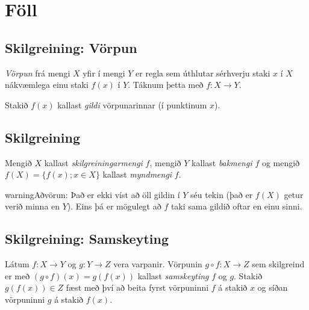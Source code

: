 \documentclass[b5paper,11pt,icelandic]{sphinxmanual}
\begin{document}
\section{Föll}
\label{kafli01:foll}

\subsection{Skilgreining: Vörpun}
\label{kafli01:skilgreining-vorpun}\label{kafli01:index-3}
\textit{Vörpun} frá mengi \(X\) yfir í mengi \(Y\) er
regla sem úthlutar sérhverju staki \(x\) í \(X\) nákvæmlega einu
staki \(f(x)\) í \(Y\). Táknum þetta með \(f:X \to Y\).

Stakið \(f(x)\) kallast \textit{gildi} vörpunarinnar (í punktinum
\(x\)).


\subsection{Skilgreining}
\label{kafli01:skilgreining}\label{kafli01:index-4}
Mengið \(X\) kallast \textit{skilgreiningarmengi}
\(f\), mengið \(Y\) kallast \textit{bakmengi}
\(f\) og mengið
\(f(X) = \{ f(x); x \in X \}\) kallast \textit{myndmengi} \(f\).


\begin{notice}{warning}{Aðvörun:}
Það er ekki víst að öll gildin í \(Y\) séu tekin
(það er \(f(X)\) getur verið minna en \(Y\)). Eins þá er mögulegt
að \(f\) taki sama gildið oftar en einu sinni.
\end{notice}


\subsection{Skilgreining: Samskeyting}
\label{kafli01:skilgreining-samskeyting}\label{kafli01:index-5}\label{kafli01:samskeyting}
Látum \(f:X \to Y\) og \(g:Y \to Z\) vera
varpanir. Vörpunin \(g\circ f:X \to Z\) sem skilgreind er með
\((g\circ f)(x)=g(f(x))\) kallast \textit{samskeyting} \(f\) og
\(g\). Stakið \(g(f(x)) \in Z\) fæst með því að beita fyrst
vörpuninni \(f\) á stakið \(x\) og síðan vörpuninni \(g\) á
stakið \(f(x)\).
\end{document}
